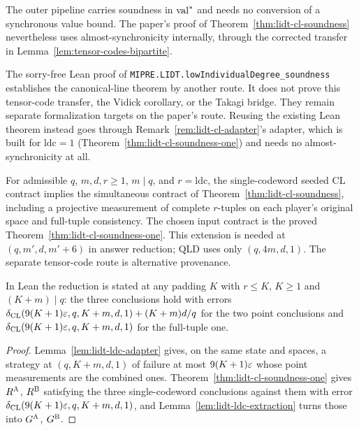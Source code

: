\begin{remark}
\label{rem:almost-sync-transitive}
The outer pipeline carries soundness in $\mathrm{val}^*$ and needs no conversion of a
synchronous value bound. The paper's proof of Theorem~\ref{thm:lidt-cl-soundness}
nevertheless uses almost-synchronicity internally, through the corrected transfer
in Lemma~\ref{lem:tensor-codes-bipartite}.

The sorry-free Lean proof of \texttt{MIPRE.LIDT.lowIndividualDegree\_soundness}
establishes the canonical-line theorem by another route. It does not prove this
tensor-code transfer, the Vidick corollary, or the Takagi bridge. They remain
separate formalization targets on the paper's route. Reusing the existing Lean
theorem instead goes through Remark~\ref{rem:lidt-cl-adapter}'s adapter, which is built
for $\mathrm{ldc}=1$ (Theorem~\ref{thm:lidt-cl-soundness-one}) and needs no
almost-synchronicity at all.
\end{remark}

\effortHard

\begin{lemma}
\label{lem:lidt-ldc}
\leanok
For admissible $q$, $m,d,r\geq1$, $m\mid q$, and $r=\mathrm{ldc}$, the
single-codeword seeded CL contract implies the simultaneous contract of
Theorem~\ref{thm:lidt-cl-soundness}, including a projective measurement of
complete $r$-tuples on each player's original space and full-tuple consistency.
The chosen input contract is the proved Theorem~\ref{thm:lidt-cl-soundness-one}.
This extension is needed at $(q,m',d,m'+6)$ in answer reduction; QLD uses only
$(q,4m,d,1)$. The separate tensor-code route is alternative provenance.

In Lean the reduction is stated at any padding $K$ with $r\leq K$, $K\geq1$ and $(K+m)\mid q$:
the three conclusions hold with errors $\delta_{\mathrm{CL}}(9(K+1)\varepsilon,q,K+m,d,1)+(K+m)d/q$
for the two point conclusions and $\delta_{\mathrm{CL}}(9(K+1)\varepsilon,q,K+m,d,1)$ for the full-tuple
one.
\end{lemma}

\begin{proof}
\leanok
{}
Lemma~\ref{lem:lidt-ldc-adapter} gives, on the same state and spaces, a strategy at
$(q,K+m,d,1)$ of failure at most $9(K+1)\varepsilon$ whose point measurements are the combined ones.
Theorem~\ref{thm:lidt-cl-soundness-one} gives $R^{\textsc{A}}$, $R^{\textsc{B}}$ satisfying the three
single-codeword conclusions against them with error $\delta_{\mathrm{CL}}(9(K+1)\varepsilon,q,K+m,d,1)$,
and Lemma~\ref{lem:lidt-ldc-extraction} turns those into $G^{\textsc{A}}$, $G^{\textsc{B}}$.
\end{proof}

